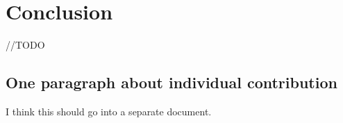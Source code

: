 \documentclass{sigchi}
\begin{document}
\section{Conclusion}
//TODO

\subsection{One paragraph about individual
contribution}
I think this should go into a separate document.

\balance{}



\end{document}
